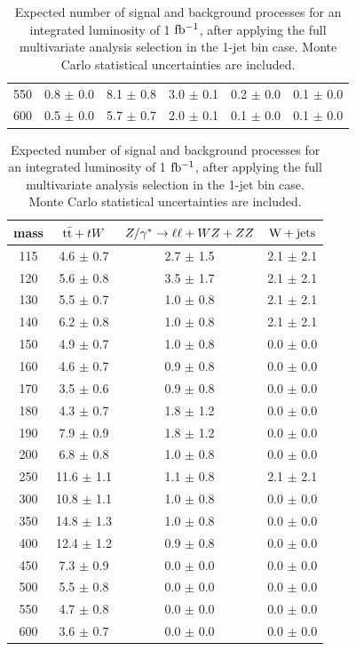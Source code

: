 \begin{table}[!ht]
\begin{center}
{\begin{tabular} {|c|c|c|c|c|c|}
550 &   0.8 $\pm$   0.0 &   8.1 $\pm$   0.8  &   3.0 $\pm$   0.1 &   0.2 $\pm$   0.0 &   0.1 $\pm$   0.0 \\
600 &   0.5 $\pm$   0.0 &   5.7 $\pm$   0.7  &   2.0 $\pm$   0.1 &   0.1 $\pm$   0.0 &   0.1 $\pm$   0.0 \\
 \hline
  \end{tabular}
  }
 {\normalsize
  \begin{tabular} {|c|c|c|c|}
\hline
  mass    & $\mathrm{t}\bar{\mathrm{t}}+tW$ & $Z/\gamma^*\to\ell\ell+WZ+ZZ$ & $\mathrm{W+jets}$  \\
  \hline
  \hline
115 &   4.6 $\pm$   0.7 &   2.7 $\pm$   1.5 &  2.1 $\pm$   2.1 \\
120 &   5.6 $\pm$   0.8 &   3.5 $\pm$   1.7 &  2.1 $\pm$   2.1 \\
130 &   5.5 $\pm$   0.7 &   1.0 $\pm$   0.8 &  2.1 $\pm$   2.1 \\
140 &   6.2 $\pm$   0.8 &   1.0 $\pm$   0.8 &  2.1 $\pm$   2.1 \\
150 &   4.9 $\pm$   0.7 &   1.0 $\pm$   0.8 &  0.0 $\pm$   0.0 \\
160 &   4.6 $\pm$   0.7 &   0.9 $\pm$   0.8 &  0.0 $\pm$   0.0 \\
170 &   3.5 $\pm$   0.6 &   0.9 $\pm$   0.8 &  0.0 $\pm$   0.0 \\
180 &   4.3 $\pm$   0.7 &   1.8 $\pm$   1.2 &  0.0 $\pm$   0.0 \\
190 &   7.9 $\pm$   0.9 &   1.8 $\pm$   1.2 &  0.0 $\pm$   0.0 \\
200 &   6.8 $\pm$   0.8 &   1.0 $\pm$   0.8 &  0.0 $\pm$   0.0 \\
250 &  11.6 $\pm$   1.1 &   1.1 $\pm$   0.8 &  2.1 $\pm$   2.1 \\
300 &  10.8 $\pm$   1.1 &   1.0 $\pm$   0.8 &  0.0 $\pm$   0.0 \\
350 &  14.8 $\pm$   1.3 &   1.0 $\pm$   0.8 &  0.0 $\pm$   0.0 \\
400 &  12.4 $\pm$   1.2 &   0.9 $\pm$   0.8 &  0.0 $\pm$   0.0 \\
450 &   7.3 $\pm$   0.9 &   0.0 $\pm$   0.0 &  0.0 $\pm$   0.0 \\
500 &   5.5 $\pm$   0.8 &   0.0 $\pm$   0.0 &  0.0 $\pm$   0.0 \\
550 &   4.7 $\pm$   0.8 &   0.0 $\pm$   0.0 &  0.0 $\pm$   0.0 \\
600 &   3.6 $\pm$   0.7 &   0.0 $\pm$   0.0 &  0.0 $\pm$   0.0 \\
 \hline
  \end{tabular}
  }
  \caption{Expected number of signal and background processes for an 
  integrated luminosity of 1 $\mathrm{fb^{-1}}$, after applying the full multivariate analysis 
  selection in the 1-jet bin case. Monte Carlo statistical uncertainties are included.}
   \label{tab:mvasel1j}
  \end{center}
\end{table}
